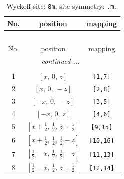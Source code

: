 \documentclass[fleqn,8pt]{jsarticle}
\begin{document}
\begin{longtable}{ccc}
\caption{Wyckoff site: {\tt 8m}, site symmetry: {\tt .m.}}
 \\
 \hline \hline
No. & position & mapping \\ \hline \endfirsthead

\multicolumn{2}{l}{\tablename\ \thetable{}} \\
 \hline \hline
No. & position & mapping \\ \hline \endhead

 \hline \hline
\multicolumn{2}{r}{\footnotesize\it continued ...} \\ \endfoot

 \hline \hline
\multicolumn{2}{r}{} \\ \endlastfoot

1 & $\left[ x,\, 0,\, z \right]$ & {\tt [1,7]} \\ \hline
2 & $\left[ x,\, 0,\, - z \right]$ & {\tt [2,8]} \\ \hline
3 & $\left[ - x,\, 0,\, - z \right]$ & {\tt [3,5]} \\ \hline
4 & $\left[ - x,\, 0,\, z \right]$ & {\tt [4,6]} \\ \hline
5 & $\left[ x + \frac{1}{2},\, \frac{1}{2},\, z + \frac{1}{2} \right]$ & {\tt [9,15]} \\ \hline
6 & $\left[ x + \frac{1}{2},\, \frac{1}{2},\, \frac{1}{2} - z \right]$ & {\tt [10,16]} \\ \hline
7 & $\left[ \frac{1}{2} - x,\, \frac{1}{2},\, \frac{1}{2} - z \right]$ & {\tt [11,13]} \\ \hline
8 & $\left[ \frac{1}{2} - x,\, \frac{1}{2},\, z + \frac{1}{2} \right]$ & {\tt [12,14]} \\
\end{longtable}
\renewcommand{\arraystretch}{1.2}
\end{document}
